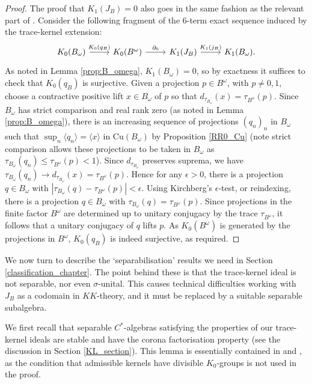 \documentclass[reqno]{amsart}
\theoremstyle{definition}
\theoremstyle{remark}
\numberwithin{equation}{section}
\theoremstyle{definition}
\begin{document}
\begin{proof}
The proof that $K_{1}(J_{B}) = 0$ also goes in the same fashion as the relevant part of \cite[Proposition 3.2(3)]{Schafhauser.Annals}. Consider the following fragment of the $6$-term exact sequence induced by the trace-kernel extension:
\begin{equation} 
\begin{tikzcd} K_0(B_\omega) \arrow{r}{K_0(q_B)} & K_0(B^\omega) \arrow{r}{\partial_0} & K_1(J_B) \arrow{r}{K_1(j_B)} & K_1(B_\omega). 
\end{tikzcd}
\end{equation} 
As noted in Lemma \ref{prop:B_omega}, $K_{1}(B_{\omega}) = 0$, so by exactness it suffices to check that $K_{0}(q_{B})$ is surjective. Given a projection $p\in B^\omega$, with $p\neq 0,1$, choose a contractive positive lift $x\in B_\omega$ of $p$ so that $d_{\tau_{B_\omega}}(x)=\tau_{B^\omega}(p)$. Since $B_\omega$ has strict comparison and real rank zero (as noted in Lemma \ref{prop:B_omega}), there is an increasing sequence of projections $(q_n)_{n}$ in $B_\omega$ such that $\sup_{n}\langle q_n\rangle=\langle x\rangle$ in $\mathrm{Cu}(B_\omega)$ by Proposition \ref{RR0_Cu} (note strict comparison allows these projections to be taken in $B_\omega$ as $\tau_{B_\omega}(q_n)\leq \tau_{B^{\omega}}(p)<1$).  Since $d_{\tau_{B_\omega}}$ preserves suprema, we have $\tau_{B_\omega}(q_n)\to d_{\tau_{B_\omega}}(x) =\tau_{B^\omega}(p)$.  Hence for any $\epsilon>0$, there is a projection $q\in B_\omega$ with $|\tau_{B_\omega}(q)-\tau_{B^\omega}(p)|<\epsilon$. Using Kirchberg's $\epsilon$-test, or reindexing, there is a projection $q\in B_\omega$ with $\tau_{B_\omega}(q)=\tau_{B^\omega}(p)$.  Since projections in the finite factor $B^\omega$ are determined up to unitary conjugacy by the trace $\tau_{B^{\omega}}$, it follows that a unitary conjugacy of $q$ lifts $p$. As $K_0(B^\omega)$ is generated by the projections in $B^\omega$, $K_0(q_B)$ is indeed surjective, as required.  
\end{proof}


We now turn to describe the `separabilisation' results we need in Section \ref{classification_chapter}.  The point behind these is that the trace-kernel ideal is not separable, nor even $\sigma$-unital.  This causes technical difficulties working with $J_B$ as a codomain in $KK$-theory, and it must be replaced  by a suitable separable subalgebra. 

We first recall that separable $C^*$-algebras satisfying the properties of our trace-kernel ideals are stable and have the corona factorisation property (see the discussion in Section \ref{KL_section}). This lemma is essentially contained in \cite[Theorem 2.2]{new-TWW} and \cite[Proposition 3.3(3)]{Schafhauser.Annals}, as the condition that admissible kernels have divisible $K_0$-groups is not used in the proof.
\end{document}
